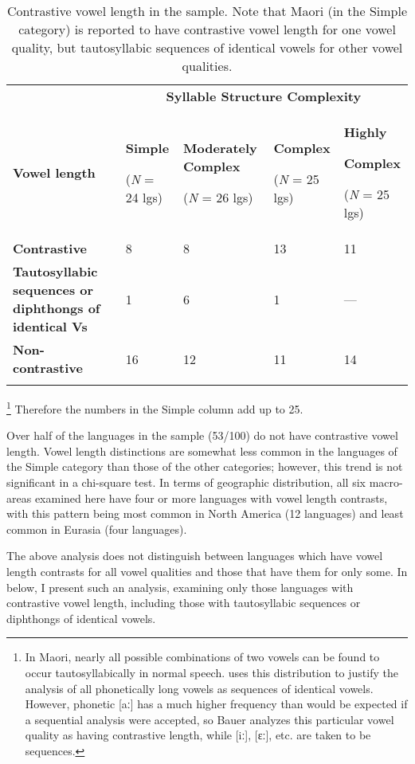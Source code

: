 \begin{table}
\begin{tabularx}{\textwidth}{XXXXX}
 & \multicolumn{4}{c}{ \textbf{Syllable Structure Complexity}}\\
\lsptoprule
\textbf{Vowel length} & { \textbf{Simple}}

 (\textit{N} = 24 lgs) & { \textbf{Moderately Complex}}

 (\textit{N} = 26 lgs) & { \textbf{Complex}}

 (\textit{N} = 25 lgs) & { \textbf{Highly} }

{ \textbf{Complex}}

 (\textit{N} = 25 lgs)\\
\textbf{Contrastive} & 8 & 8 & 13 & 11\\
\textbf{Tautosyllabic sequences or diphthongs of identical Vs} & 1 & 6 & 1 & —\\
\textbf{Non-contrastive} & 16 & 12 & 11 & 14\\
\lspbottomrule
\end{tabularx}
\caption{\label{tab:4.3}Contrastive vowel length in the sample. Note that Maori (in the Simple category) is reported to have contrastive vowel length for one vowel quality, but tautosyllabic sequences of identical vowels for other vowel qualities.}
\footnote{{In Maori, nearly all possible combinations of two vowels can be found to occur tautosyllabically in normal speech. \citet[524-8]{Bauer1999} uses this distribution to justify the analysis of all phonetically long vowels as sequences of identical vowels. However, phonetic [aː] has a much higher frequency than would be expected if a sequential analysis were accepted, so Bauer analyzes this particular vowel quality as having contrastive length, while [iː], [ɛː], etc. are taken to be sequences.}}
Therefore the numbers in the Simple column add up to 25.
\end{table}

  Over half of the languages in the sample (53/100) do not have contrastive vowel length. Vowel length distinctions are somewhat less common in the languages of the Simple category than those of the other categories; however, this trend is not significant in a chi-square test. In terms of geographic distribution, all six macro-areas examined here have four or more languages with vowel length contrasts, with this pattern being most common in North America (12 languages) and least common in Eurasia (four languages).

  The above analysis does not distinguish between languages which have vowel length contrasts for all vowel qualities and those that have them for only some. In  below, I present such an analysis, examining only those languages with contrastive vowel length, including those with tautosyllabic sequences or diphthongs of identical vowels.

